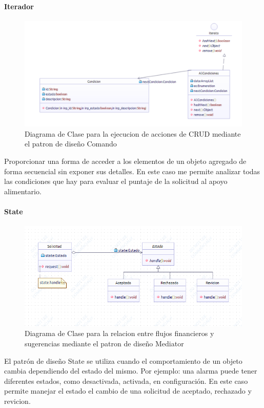 \paragraph{Iterador}
\begin{figure}[H]
	\centering
	\includegraphics[width=1\linewidth]{parte2/imgs/Patrones/Iterador}
	\caption[Diagrama de clases del patrón Iterador]{Diagrama de Clase para la ejecucion de acciones de CRUD mediante el patron de diseño Comando}
	\label{fig:command}
\end{figure}

Proporcionar una forma de acceder a los elementos de un objeto agregado de forma secuencial sin exponer sus detalles. En este caso me permite analizar todas las condiciones que hay para evaluar el puntaje de la solicitud al apoyo alimentario.



\paragraph{State}
\begin{figure}[H]
	\centering
	\includegraphics[width=1\linewidth]{parte2/imgs/Patrones/Estado}
	\caption[Diagrama de clases del patrón State]{Diagrama de Clase para la relacion entre flujos financieros y sugerencias mediante el patron de diseño Mediator}
	\label{fig:mediador}
\end{figure}
El patrón de diseño State se utiliza cuando el comportamiento de un objeto cambia dependiendo del estado del mismo. Por ejemplo: una alarma puede tener diferentes estados, como desactivada, activada, en configuración. En este caso permite manejar el estado el cambio de una solicitud de aceptado, rechazado y revicion.

